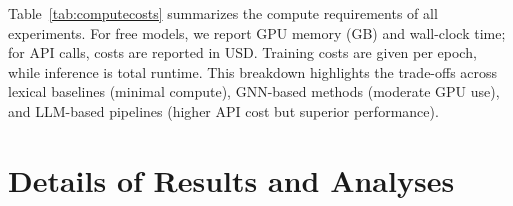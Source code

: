 Table~\ref{tab:computecosts} summarizes the compute requirements of all experiments. For free models, we report GPU memory (GB) and wall-clock time; for API calls, costs are reported in USD. Training costs are given per epoch, while inference is total runtime. This breakdown highlights the trade-offs across lexical baselines (minimal compute), GNN-based methods (moderate GPU use), and LLM-based pipelines (higher API cost but superior performance).  







\section{Details of Results and Analyses} \label{app:results}




